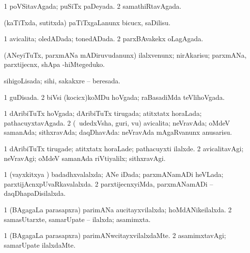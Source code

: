 \bentry
{} 
\gl{\gu}
\expl{}
\bmng
\bnum
\num{1} poVSitavAgada; puSiTx paDeyada. 
\num{2} samathiRtavAgada. 
\enum
\emng
\eentry

\bentry
{} 
\gl{\sakirx}
\expl{}
\bmng
(kaTiTxda, sutitxda) paTiTxgaLanunx bicucx, saDilisu. 
\emng
\eentry

\bentry
{} 
\gl{\gu}
\expl{}
\bmng
\bnum
\num{1} avicalita; oledADada; tonedADada. 
\num{2} parxBAvakekx oLagAgada. 
\enum
\emng
\eentry

\bentry
{} 
\gl{\sakirx}
\expl{}
\bmng
(ANeyiTuTx, parxmANa mADiruvudanunx) ilalxvenunx; nirAkarisu; parxmANa, parxtijecnx, shApa -hiMtegeduko. 
\emng
\eentry

\bentry
{} 
\gl{\gu}
\expl{}
\bmng
sihigoLisada; sihi, sakakxre -- beresada. 
\emng
\eentry

\bentry
{} 
\gl{\gu}
\expl{}
\bmng
\bnum
\num{1} guDisada. 
\num{2} biVsi (kocicx)koMDu hoVgada; raBasadiMda teVlihoVgada. 
\enum
\emng
\eentry

\bentry
{} 
\gl{\gu}
\expl{}
\bmng
\bnum
\num{1} dAribiTuTx hoVgada; dAribiTuTx tirugada; atitxtatx horaLada; pathacuyxtavAgada. 
\num{2} (\kanmu\ udedxVsha, guri, \mo vu) avicalita; neVravAda; oMdeV samanAda; sithxravAda; daqDhavAda:  neVravAda mAgaRvanunx anusarisu. 
\enum
\emng
\eentry

\bentry
{} 
\gl{\kirxvi}
\expl{}
\bmng
\bnum
\num{1} dAribiTuTx tirugade; atitxtatx horaLade; pathacuyxti ilalxde. 
\num{2} avicalitavAgi; neVravAgi; oMdeV samanAda riVtiyalilx; sithxravAgi. 
\enum
\emng
\eentry

\bentry
{} 
\gl{\gu}
\expl{}
\bmng
\bnum
\num{1} (vayxkitxya \vi) badadhxvalalxda; ANe iDada; parxmANamADi heVLada; parxtijAcnxpUvaRkavalalxda. 
\num{2} parxtijecnxyiMda, parxmANamADi -- daqDhapaDisilalxda. 
\enum
\emng
\eentry

\bentry
{} 
\gl{\gu}
\expl{}
\bmng
\bnum
\num{1} (BAgagaLa parasapxra) parimANa aucitayxvilalxda; hoMdANikeilalxda. 
\num{2} samasUtarxte, samarUpate -- ilalxda; asamimxta. 
\enum
\emng
\eentry

\bentry
{} 
\gl{\kirxvi}
\expl{}
\bmng
\bnum
\num{1} (BAgagaLa parasapxra) parimANwcitayxvilalxdaMte. 
\num{2} asamimxtavAgi; samarUpate ilalxdaMte. 
\enum
\emng
\eentry

